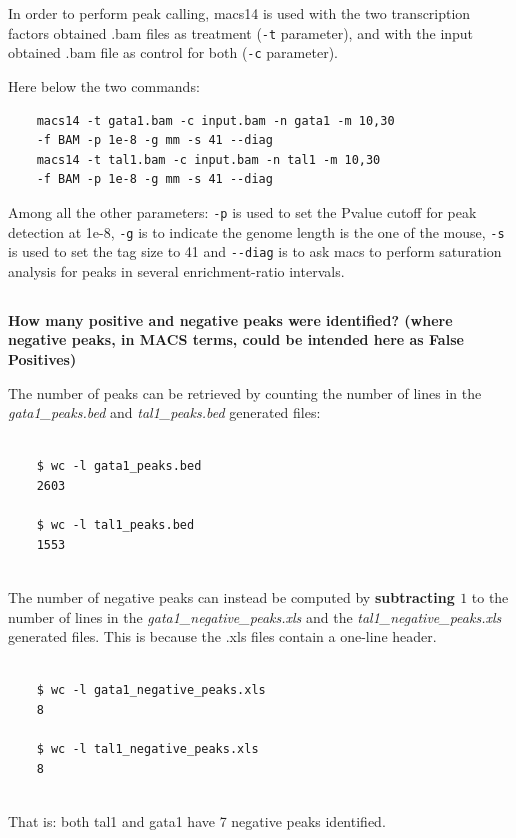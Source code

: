 \documentclass[12pt, a4paper]{article}
\begin{document}
	In order to perform peak calling, macs14 is used with the two transcription factors obtained .bam files as treatment (\verb|-t| parameter), and with the input obtained .bam file as control for both (\verb|-c| parameter).
	
	Here below the two commands:
	
	\begin{verbatim}
	macs14 -t gata1.bam -c input.bam -n gata1 -m 10,30
	-f BAM -p 1e-8 -g mm -s 41 --diag
	macs14 -t tal1.bam -c input.bam -n tal1 -m 10,30
	-f BAM -p 1e-8 -g mm -s 41 --diag
	\end{verbatim}
	
	Among all the other parameters: \verb|-p| is used to set the Pvalue cutoff for peak detection at 1e-8, \verb|-g| is to indicate the genome length is the one of the mouse, \verb|-s| is used to set the tag size to 41 and \verb|--diag| is to ask macs to perform saturation analysis for peaks in several enrichment-ratio intervals.
	
	\subsection{}
	\textbf{How many positive and negative peaks were identified? (where negative peaks, in MACS terms, could be intended here as False Positives)}
	
	The number of peaks can be retrieved by counting the number of lines in the \textit{gata1\_peaks.bed} and \textit{tal1\_peaks.bed} generated files:
	
	\begin{verbatim}
	
	$ wc -l gata1_peaks.bed
	2603
	
	$ wc -l tal1_peaks.bed
	1553
	
	\end{verbatim}
	
	The number of negative peaks can instead be computed by \textbf{subtracting $1$} to the number of lines in the \textit{gata1\_negative\_peaks.xls} and the \textit{tal1\_negative\_peaks.xls} generated files. This is because the .xls files contain a one-line header.
	
	\begin{verbatim}
	
	$ wc -l gata1_negative_peaks.xls
	8
	
	$ wc -l tal1_negative_peaks.xls
	8
	
	\end{verbatim}
	
	That is: both tal1 and gata1 have 7 negative peaks identified.
	
\end{document}
